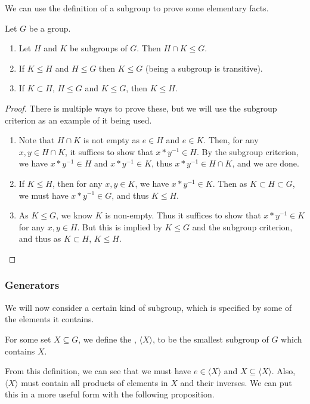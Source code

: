 \documentclass[a4paper]{scrartcl}
\newcommand{\newsubsection}{\subsubsection}
\begin{document}
We can use the definition of a subgroup to prove some elementary facts.
\begin{proposition}
	Let $G$ be a group.
	\begin{enumerate}[label=(\roman*)]
		\item Let $H$ and $K$ be subgroups of $G$. Then $H \cap K \leq G$.
		\item If $K \leq H$ and $H \leq G$ then $K \leq G$ (being a subgroup is transitive).
		\item If $K \subset H$, $H \leq G$ and $K \leq G$, then $K \leq H$. 
	\end{enumerate}
\end{proposition}
\begin{proof} There is multiple ways to prove these, but we will use the subgroup criterion as an example of it being used.\phantom{\qedhere}
	\begin{enumerate}[label=(\roman*)]
		\item Note that $H \cap K$ is not empty as $e \in H$ and $e \in K$. Then, for any $x, y \in H \cap K$, it suffices to show that $x * y^{-1} \in H$. By the subgroup criterion, we have $x * y^{-1} \in H$ and $x*y^{-1} \in K$, thus $x * y^{-1} \in H \cap K$, and we are done.
		\item If $K \leq H$, then for any $x, y \in K$, we have $x * y^{-1} \in K$. Then as $K \subset H \subset G$, we must have $x * y^{-1} \in G$, and thus $K \leq H$.
		\item As $K \leq G$, we know $K$ is non-empty. Thus it suffices to show that $x * y^{-1} \in K$ for any $x, y \in H$. But this is implied by $K \leq G$ and the subgroup criterion, and thus as $K \subset H$, $K \leq H$. \hfill \qedsymbol
	\end{enumerate}
\end{proof}

\newsubsection{Generators}

We will now consider a certain kind of subgroup, which is specified by some of the elements it contains.

\begin{definition}
	For some set $X \subseteq G$, we define the , $\langle X \rangle$, to be the smallest subgroup of $G$ which contains $X$.
\end{definition}

From this definition, we can see that we must have $e \in \langle X \rangle$ and $X \subseteq \langle X\rangle$. Also, $\langle X \rangle$ must contain all products of elements in $X$ and their inverses.
We can put this in a more useful form with the following proposition.
\end{document}
